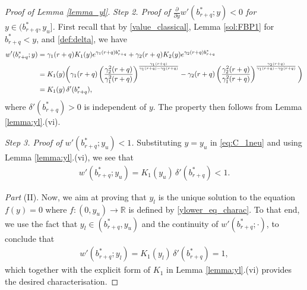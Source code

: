 \documentclass[11pt]{article} %
\def\R{\mathbb{R}}
\numberwithin{komcounter}{section}
\numberwithin{equation}{section}
\numberwithin{theorem}{section}
\begin{document}
\begin{proof}[Proof of Lemma \ref{lemma_yl}]
\vspace{1mm}
{\it Step 2. Proof of $\frac{\partial}{\partial y} w'(b^*_{r+q}; y) < 0$ for $y \in (b^*_{r+q}, y_u]$.}
First recall that by \eqref{value_classical}, Lemma \ref{sol:FBP1} for $b^*_{r+q} < y$, and \eqref{def:delta}, we have
\begin{align}
w'(b^*_{r+q}; y) 
&= \gamma_1(r+q)K_1(y) e^{\gamma_1(r+q)b^*_{r+q}} + \gamma_2(r+q)K_2(y) e^{\gamma_2(r+q)b^*_{r+q}} \notag\\
&= K_1(y) \bigg(\gamma_1(r+q) \left( \frac{\gamma_2^2(r+q)}{\gamma_1^2(r+q)}\right)^{\frac{\gamma_1(r+q)}{\gamma_1(r+q) - \gamma_2(r+q)}}
- \gamma_2(r+q) \left( \frac{\gamma_2^2(r+q)}{\gamma_1^2(r+q)} \right)^{\frac{\gamma_2(r+q)}{\gamma_1(r+q) - \gamma_2(r+q)}} \bigg) 
\notag\\
&= K_1(y) \, \delta'(b^*_{r+q}) 
\label{eq:C_1neu},
\end{align}
where $\delta'(b^*_{r+q}) > 0$ is independent of $y$. 
The property then follows from Lemma \ref{lemma:yl}.(vi).

\vspace{1mm}
{\it Step 3. Proof of $w'(b^*_{r+q};y_u)<1$.}
Substituting $y=y_u$ in \eqref{eq:C_1neu} and using Lemma \ref{lemma:yl}.(vi), we see that
\begin{align*}
w'(b^*_{r+q}; y_u) = K_1(y_u) \, \delta'(b^*_{r+q}) < 1.
\end{align*}

\vspace{1mm}
{\it Part} (II).
Now, we aim at proving that $y_l$ is the unique solution to the equation $f(y) = 0$ where $f:(0,y_u) \to \R$ is defined by \eqref{ylower_eq_charac}. 
To that end, we use the fact that $y_l\in(b^*_{r+q},y_u)$ and the continuity of $w'(b^*_{r+q}; \cdot)$, to conclude that 
\begin{align} \label{w'b=1}
w'(b^*_{r+q}; y_l) = K_1(y_l) \, \delta'(b^*_{r+q}) = 1 ,
\end{align}
which together with the explicit form of $K_1$ in Lemma \ref{lemma:yl}.(vi) provides the desired characterisation.
\end{proof}
\end{document}
